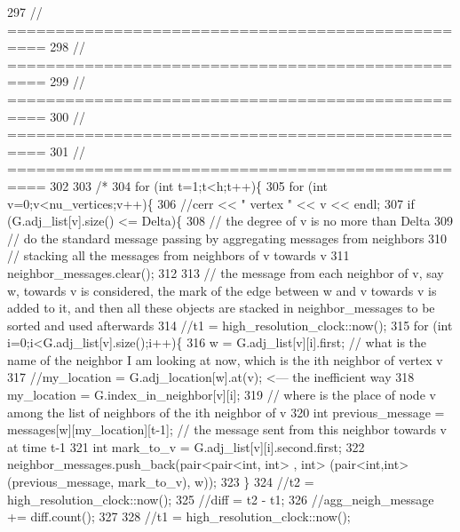 \begin{DoxyCode}
297   \textcolor{comment}{// ==================================================}
298   \textcolor{comment}{// ==================================================}
299   \textcolor{comment}{// ==================================================}
300   \textcolor{comment}{// ==================================================}
301   \textcolor{comment}{// ==================================================}
302 
303   \textcolor{comment}{/*}
304 \textcolor{comment}{  for (int t=1;t<h;t++)\{}
305 \textcolor{comment}{    for (int v=0;v<nu\_vertices;v++)\{}
306 \textcolor{comment}{      //cerr << " vertex " << v << endl;}
307 \textcolor{comment}{      if (G.adj\_list[v].size() <= Delta)\{}
308 \textcolor{comment}{        // the degree of v is no more than Delta}
309 \textcolor{comment}{        // do the standard message passing by aggregating messages from neighbors}
310 \textcolor{comment}{        // stacking all the messages from neighbors of v towards v}
311 \textcolor{comment}{        neighbor\_messages.clear();}
312 \textcolor{comment}{}
313 \textcolor{comment}{        // the message from each neighbor of v, say w,  towards v is considered, the mark of the edge
       between w and v towards v is added to it, and then all these objects are stacked in neighbor\_messages to be
       sorted and used afterwards}
314 \textcolor{comment}{        //t1 = high\_resolution\_clock::now();}
315 \textcolor{comment}{        for (int i=0;i<G.adj\_list[v].size();i++)\{}
316 \textcolor{comment}{          w = G.adj\_list[v][i].first; // what is the name of the neighbor I am looking at now, which is the
       ith neighbor of vertex v }
317 \textcolor{comment}{          //my\_location = G.adj\_location[w].at(v); <--- the inefficient way}
318 \textcolor{comment}{          my\_location = G.index\_in\_neighbor[v][i];}
319 \textcolor{comment}{          // where is the place of node v among the list of neighbors of the ith neighbor of v}
320 \textcolor{comment}{          int previous\_message = messages[w][my\_location][t-1]; // the message sent from this neighbor
       towards v at time t-1}
321 \textcolor{comment}{          int mark\_to\_v = G.adj\_list[v][i].second.first;}
322 \textcolor{comment}{          neighbor\_messages.push\_back(pair<pair<int, int> , int> (pair<int,int>(previous\_message,
       mark\_to\_v), w));}
323 \textcolor{comment}{        \}}
324 \textcolor{comment}{        //t2 = high\_resolution\_clock::now();}
325 \textcolor{comment}{        //diff = t2 - t1;}
326 \textcolor{comment}{        //agg\_neigh\_message += diff.count();}
327 \textcolor{comment}{}
328 \textcolor{comment}{        //t1 = high\_resolution\_clock::now();}

\end{DoxyCode}
